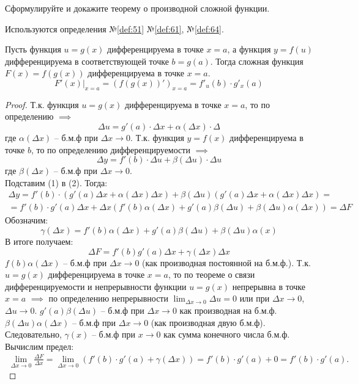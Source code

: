 \begin{question}
    Сформулируйте и докажите теорему о производной сложной функции.
\end{question}
\begin{used}
    Используются определения №\ref{def:51} №\ref{def:61}, №\ref{def:64}.
\end{used}
\begin{theorem}
    Пусть функция $u = g(x)$ дифференцируема в точке $x = a$, а функция $y = f(u)$ дифференцируема в соответствующей точке  $b = g(a)$.
    Тогда сложная функция $F(x) = f(g(x))$ дифференцируема в точке $x = a$. \[
        F'(x) |_{x = a} = \left(f(g(x))'\right)_{x = a} = f'_u(b) \cdot g'_x(a)
    \]
\end{theorem}
\begin{proof}
    Т.к. функция $u = g(x)$ дифференцируема в точке $x = a$, то по определению $\implies$\[
    \Delta u = g'(a) \cdot \Delta x + \alpha(\Delta x) \cdot \Delta \tag{1}
    \] 
    где $\alpha(\Delta x)$ -- б.м.ф при $\Delta x \to 0$.
    Т.к. функция $y = f(x)$ дифференцируема в точке  $b$, то по определению дифференцируемости  $\implies$ \[
        \Delta y = f'(b) \cdot \Delta u + \beta(\Delta u) \cdot \Delta u \tag{2}
    \] 
    где $\beta(\Delta x)$ -- б.м.ф при $\Delta x \to 0$. \\
    Подставим (1) в (2). Тогда:
    \begin{gather*}
        \Delta y = f'(b) \cdot \left( g'(a) \Delta x + \alpha(\Delta x) \Delta x \right) + \beta(\Delta u)\left( g'(a) \Delta x + \alpha(\Delta x) \Delta x \right) = \\
        = f'(b) \cdot  g'(a) \Delta x + \Delta x\left(f'(b) \alpha(\Delta x) + g'(a) \beta(\Delta u) + \beta(\Delta u) \alpha(\Delta x)\right) = \Delta F
    \end{gather*}
    Обозначим: \[
        \gamma(\Delta x) = f'(b) \alpha(\Delta x) + g'(a) \beta(\Delta u) + \beta(\Delta u) \alpha(x)
    \] 
    В итоге получаем: \[
        \Delta F = f'(b)g'(a)\Delta x + \gamma(\Delta x)\Delta x
    \]
    $f(b) \alpha(\Delta x)$ -- б.м.ф при $\Delta x \to 0$ (как производная постоянной на б.м.ф.). 
    Т.к. $u = g(x)$ дифференцируема в точке $x = a$, то по теореме о связи дифференцируемости и непрерывности функции $u = g(x)$ непрерывна в точке $x = a$  $\implies$ по определению непрерывности $\lim_{\Delta x \to 0} \Delta u = 0$ или при $\Delta x \to 0$, $\Delta u \to 0$. $g'(a) \beta(\Delta u)$ -- б.м.ф при $\Delta x \to  0$ как производная на б.м.ф. $\beta(\Delta u) \alpha(\Delta x)$ -- б.м.ф при $\Delta x \to  0$ (как производная двую б.м.ф).
    Следовательно, $\gamma(x)$ -- б.м.ф при $x \to 0$ как сумма конечного числа б.м.ф. \\
    Вычислим предел:
    \begin{gather*}
        \lim_{\Delta x \to 0} \frac{\Delta F}{\Delta x} = \lim_{\Delta x \to 0} \left( f'(b) \cdot g'(a) + \gamma(\Delta x) \right) = f'(b) \cdot g'(a) + 0 = f'(b) \cdot g'(a).
    \end{gather*}
\end{proof}
\pagebreak



